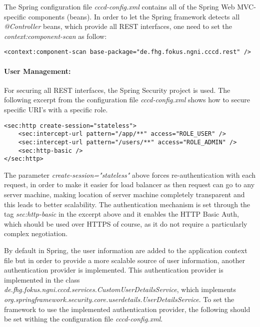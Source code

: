The Spring configuration file \textit{cccd-config.xml} contains all of the Spring Web MVC-specific components (beans). In order to let the Spring framework detects all \textit{@Controller} beans, which provide all REST interfaces, one need to set the \textit{context:component-scan} as follow:
\begin{code}
\begin{verbatim}
<context:component-scan base-package="de.fhg.fokus.ngni.cccd.rest" />
\end{verbatim}
\end{code}

\paragraph{User Management:} For securing all REST interfaces, the Spring Security project is used. The following excerpt from the configuration file \textit{cccd-config.xml} shows how to secure specific URI's with a specific role.
\begin{code}
\begin{verbatim}
<sec:http create-session="stateless">
 	<sec:intercept-url pattern="/app/**" access="ROLE_USER" />
	<sec:intercept-url pattern="/users/**" access="ROLE_ADMIN" />
	<sec:http-basic />
</sec:http>
\end{verbatim}
\end{code}

The parameter \textit{create-session="stateless"} above forces re-authentication with each request, in order to make it easier for load balancer as then request can go to any server machine, making location of server machine completely transparent and this leads to better scalability. The authentication mechanism is set through the tag \textit{sec:http-basic } in the excerpt above and it enables the HTTP Basic Auth, which should be used over HTTPS of course, as it do not require a particularly complex negotiation.

By default in Spring, the user information are added to the application context file but in order to provide a more scalable source of user information, another authentication provider is implemented. This authentication provider is implemented in the class \textit{de.fhg.fokus.ngni.cccd.services.CustomUserDetailsService}, which implements \textit{org.springframework.security.core.userdetails.UserDetailsService}. To set the framework to use the implemented authentication provider, the following should be set withing the configuration file \textit{cccd-config.xml}.

